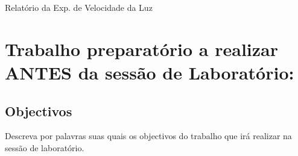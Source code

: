 \documentclass[a4paper,12pt]{article}  %
\author{Prof. Bernardo B. Carvalho}
\date{ Setembro 2015}
\newcommand{\HRule}{\rule{\linewidth}{0.5mm}}
\begin{document}
 



{  \sf  Relatório da Exp. de Velocidade da Luz} %



\section{\sf Trabalho preparatório a realizar  ANTES da sessão de Laboratório:}
\subsection{\sf Objectivos}
Descreva por palavras suas quais os objectivos do trabalho que irá realizar na sessão de laboratório.

\end{document}
